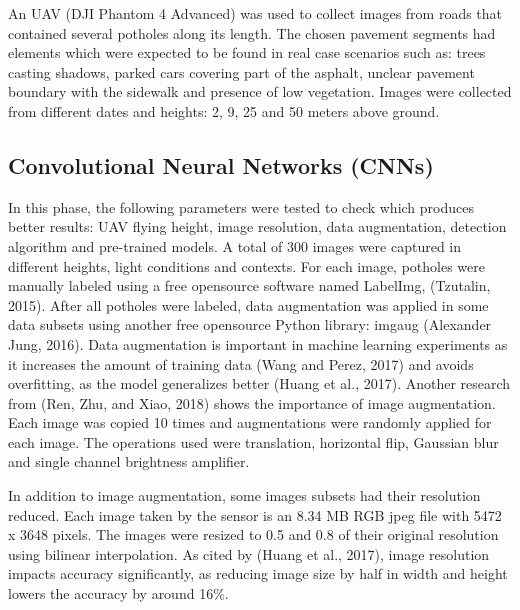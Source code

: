 \documentclass{article}
\begin{document}
An UAV (DJI Phantom 4 Advanced) was used to collect images from roads that contained several potholes along its length. The chosen pavement segments had elements which were expected to be found in real case scenarios such as: trees casting shadows, parked cars covering part of the asphalt, unclear pavement boundary with the sidewalk and presence of low vegetation. Images were collected from different dates and heights: 2, 9, 25 and 50 meters above ground. 


\subsection{Convolutional Neural Networks (CNNs)}
\label{sec:pagestyle}

In this phase, the following parameters were tested to check which produces better results: UAV flying height, image resolution, data augmentation, detection algorithm and pre-trained models.
A total of 300 images were captured in different heights, light conditions and contexts. For each image, potholes were manually labeled using a free opensource software named LabelImg, (Tzutalin, 2015). After all potholes were labeled, data augmentation was applied in some data subsets using another free opensource Python library: imgaug (Alexander Jung, 2016). Data augmentation is important in machine learning experiments as it increases the amount of training data (Wang and Perez, 2017) and avoids overfitting, as the model generalizes better (Huang et al., 2017). Another research from (Ren, Zhu, and Xiao, 2018) shows the importance of image augmentation. Each image was copied 10 times and augmentations were randomly applied for each image. The operations used were translation, horizontal flip, Gaussian blur and single channel brightness amplifier.

In addition to image augmentation, some images subsets had their resolution reduced. Each image taken by the sensor is an 8.34 MB RGB jpeg file with 5472 x 3648 pixels. The images were resized to 0.5 and 0.8 of their original resolution using bilinear interpolation. As cited by (Huang et al., 2017), image resolution impacts accuracy significantly, as reducing image size by half in width and height lowers the accuracy by around 16\%.
\end{document}
